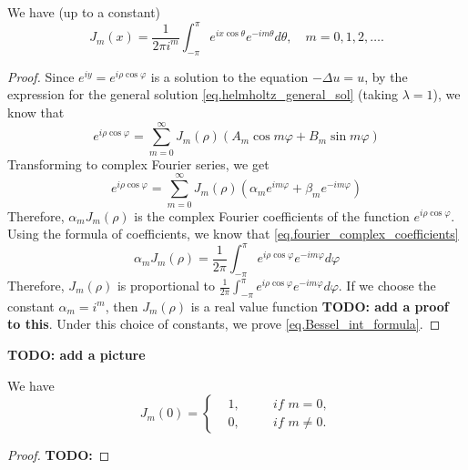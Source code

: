 \begin{proposition} We have (up to a constant)
\begin{equation}\label{eq.Bessel_int_formula}
    J_m(x)=\frac{1}{2 \pi i^m} \int_{-\pi}^\pi e^{i x \cos \theta} e^{-i m \theta} d \theta, \quad m=0,1,2, \ldots .
\end{equation}
\end{proposition}
\begin{proof}
Since $e^{iy} = e^{i\rho \cos \varphi}$ is a solution to the equation $-\Delta u = u$, by the expression for the general solution \eqref{eq.helmholtz_general_sol} (taking $\lambda = 1$), we know that 
\begin{equation}
    e^{i\rho \cos \varphi} = \sum_{m = 0}^\infty J_m(\rho)\left(A_m \cos m \varphi+B_m \sin m \varphi\right)
\end{equation}
Transforming to complex Fourier series, we get 
\begin{equation}
    e^{i\rho \cos \varphi} = \sum_{m = 0}^\infty J_m(\rho)\left(\alpha_m e^{i m \varphi}+\beta_m e^{-i m \varphi}\right)
\end{equation}
Therefore, $\alpha_m J_m(\rho)$ is the complex Fourier coefficients of the function $e^{i\rho \cos \varphi}$. Using the formula of coefficients, we know that \eqref{eq.fourier_complex_coefficients}
\begin{equation}
    \alpha_m J_m(\rho) = \frac{1}{2 \pi} \int_{-\pi}^\pi e^{i\rho \cos \varphi} e^{- i m \varphi} d\varphi
\end{equation}
Therefore, $J_m(\rho)$ is proportional to $\frac{1}{2 \pi} \int_{-\pi}^\pi e^{i\rho \cos \varphi} e^{- i m \varphi} d\varphi$. If we choose the constant $\alpha_m = i^{m}$, then $J_m(\rho)$ is a real value function \textbf{TODO: add a proof to this}. Under this choice of constants, we prove \eqref{eq.Bessel_int_formula}. 
\end{proof}

\textbf{TODO: add a picture}

\begin{lemma}[] We have
\begin{equation}\label{eq.Bessel_value_at_zero}
    J_m(0) = \left\{\begin{aligned}
    &1,\quad &&\textit{if } m = 0,
    \\
    &0, &&\textit{if } m \neq 0.
\end{aligned}
\right.
\end{equation}
\end{lemma}
\begin{proof}
    \textbf{TODO: }
\end{proof}

